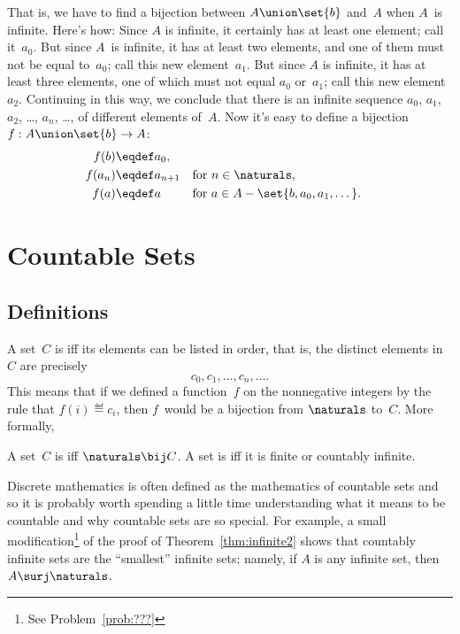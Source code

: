 That is, we have to find a bijection between $A \union \set{b}$ and~$A$
when $A$~is infinite.  Here's how: Since $A$ is infinite, it certainly
has at least one element; call it~$a_0$.  But since $A$~is infinite,
it has at least two elements, and one of them must not be equal
to~$a_0$; call this new element~$a_1$.  But since $A$ is infinite, it
has at  least three elements, one of which must not equal $a_0$
or~$a_1$; call this new element~$a_2$.  Continuing in this way, we
conclude that there is an infinite sequence $a_0$, $a_1$, $a_2$,
\dots, $a_n$, \dots, of different elements of~$A$.  Now it's easy to
define a bijection $f: A \union \set{b} \to A$:
\begin{align*}
    f(b)    &\eqdef a_0, \\
    f(a_n)  &\eqdef a_{n + 1}   && \text{for $n \in \naturals$}, \\
    f(a)    &\eqdef a           && \text{for $a \in A - \set{b, a_0,
        a_1, \dots}$}.
\end{align*}

\section{Countable Sets}\label{sec:countable}

\subsection{Definitions}

A set~$C$ is  iff its elements can be listed in order,
that is, the distinct elements in~$C$ are precisely
\begin{equation*}
    c_0, c_1, \dots, c_n, \dots.
\end{equation*}
This means that if we defined a function~$f$ on the nonnegative
integers by the rule that $f(i) \eqdef c_i$, then $f$~would be a
bijection from $\naturals$ to~$C$.  More formally,

\begin{definition}\label{def:countable}
A set~$C$ is  iff $\naturals \bij C$.  A set
is  iff it is finite or countably infinite.
\end{definition}

Discrete mathematics is often defined as the mathematics of countable
sets and so it is probably worth spending a little time understanding
what it means to be countable and why countable sets are so special.
For example, a small modification\footnote{See Problem~\ref{prob:???}}
of the proof of Theorem~\ref{thm:infinite2} shows that countably
infinite sets are the ``smallest'' infinite sets; namely, if $A$ is
any infinite set, then $A \surj \naturals$.

